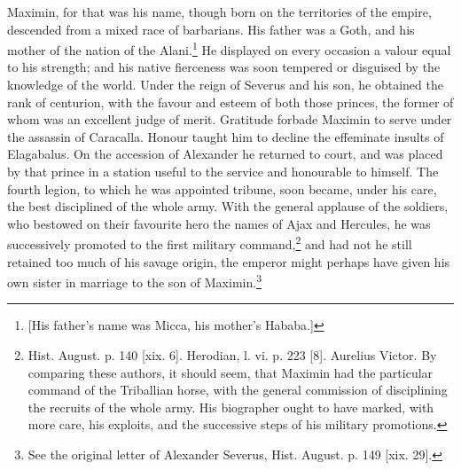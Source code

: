Maximin, for that was his name, though born on the territories of the empire, descended from a mixed race of barbarians. His father was a Goth, and his mother of the nation of the Alani.\footnote{[His father\texthebrew{}’s name was Micca, his mother\texthebrew{}’s Hababa.]} He displayed on every occasion a valour equal to his strength; and his native fierceness was soon tempered or disguised by the knowledge of the world. Under the reign of Severus and his son, he obtained the rank of centurion, with the favour and esteem of both those princes, the former of whom was an excellent judge of merit. Gratitude forbade Maximin to serve under the assassin of Caracalla. Honour taught him to decline the effeminate insults of Elagabalus. On the accession of Alexander he returned to court, and was placed by that prince in a station useful to the service and honourable to himself. The fourth legion, to which he was appointed tribune, soon became, under his care, the best disciplined of the whole army. With the general applause of the soldiers, who bestowed on their favourite hero the names of Ajax and Hercules, he was successively promoted to the first military command,\footnote{Hist. August. p. 140 [xix. 6]. Herodian, l. vi. p. 223 [8]. Aurelius Victor. By comparing these authors, it should seem, that Maximin had the particular command of the Triballian horse, with the general commission of disciplining the recruits of the whole army. His biographer ought to have marked, with more care, his exploits, and the successive steps of his military promotions.} and had not he still retained too much of his savage origin, the emperor might perhaps have given his own sister in marriage to the son of Maximin.\footnote{See the original letter of Alexander Severus, Hist. August. p. 149 [xix. 29].}

